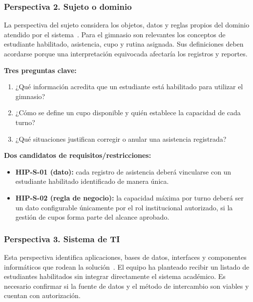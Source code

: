 \subsubsection{Perspectiva 2. Sujeto o dominio}
La perspectiva del sujeto considera los objetos, datos y reglas propios del dominio atendido por el sistema~\cite{pohl2025}. Para el gimnasio son relevantes los conceptos de estudiante habilitado, asistencia, cupo y rutina asignada. Sus definiciones deben acordarse porque una interpretación equivocada afectaría los registros y reportes.

\textbf{Tres preguntas clave:}
\begin{enumerate}
\item ¿Qué información acredita que un estudiante está habilitado para utilizar el gimnasio?
\item ¿Cómo se define un cupo disponible y quién establece la capacidad de cada turno?
\item ¿Qué situaciones justifican corregir o anular una asistencia registrada?
\end{enumerate}
\textbf{Dos candidatos de requisitos/restricciones:}
\begin{itemize}
\item \textbf{HIP-S-01 (dato):} cada registro de asistencia deberá vincularse con un estudiante habilitado identificado de manera única.
\item \textbf{HIP-S-02 (regla de negocio):} la capacidad máxima por turno deberá ser un dato configurable únicamente por el rol institucional autorizado, si la gestión de cupos forma parte del alcance aprobado.
\end{itemize}

\subsubsection{Perspectiva 3. Sistema de TI}
Esta perspectiva identifica aplicaciones, bases de datos, interfaces y componentes informáticos que rodean la solución~\cite{pohl2025}. El equipo ha planteado recibir un listado de estudiantes habilitados sin integrar directamente el sistema académico. Es necesario confirmar si la fuente de datos y el método de intercambio son viables y cuentan con autorización.

